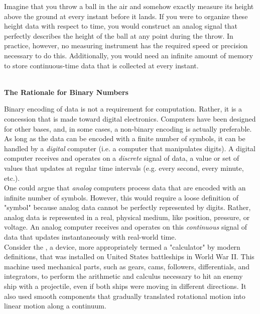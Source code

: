 Imagine that you throw a ball in the air and somehow exactly measure its height above the ground at every instant before it lands. If you were to organize these height data with respect to time, you would construct an analog signal that perfectly describes the height of the ball at any point during the throw. In practice, however, no measuring instrument has the required speed or precision necessary to do this. Additionally, you would need an infinite amount of memory to store continuous-time data that is collected at every instant. \\\\


\begin{tcolorbox}[breakable, enhanced, colback=textbook-blue, sharp corners]
	\vspace{3mm}
	\begin{center}
		\textbf{The Rationale for Binary Numbers}
	\end{center}
	
	Binary encoding of data is not a requirement for computation. Rather, it is a concession that is made toward digital electronics. Computers have been designed for other bases, and, in some cases, a non-binary encoding is actually preferable. As long as the data can be encoded with a finite number of symbols, it can be handled by a \textit{digital} computer (i.e. a computer that manipulates digits). A digital computer receives and operates on a \textit{discrete} signal of data, a value or set of values that updates at regular time intervals (e.g. every second, every minute, etc.). \\
	
	One could argue that \textit{analog} computers process data that are encoded with an infinite number of symbols. However, this would require a loose definition of "symbol" because analog data cannot be perfectly represented by digits. Rather, analog data is represented in a real, physical medium, like position, pressure, or voltage. An analog computer receives and operates on this \textit{continuous} signal of data that updates instantaneously with real-world time.  \\
	
	Consider the  , a device, more appropriately termed a "calculator" by modern definitions, that was installed on United States battleships in World War II. This machine used mechanical parts, such as gears, cams, followers, differentials, and integrators, to perform the arithmetic and calculus necessary to hit an enemy ship with a projectile, even if both ships were moving in different directions. It also used smooth components that gradually translated rotational motion into linear motion along a continuum. \\
	

\end{tcolorbox}

